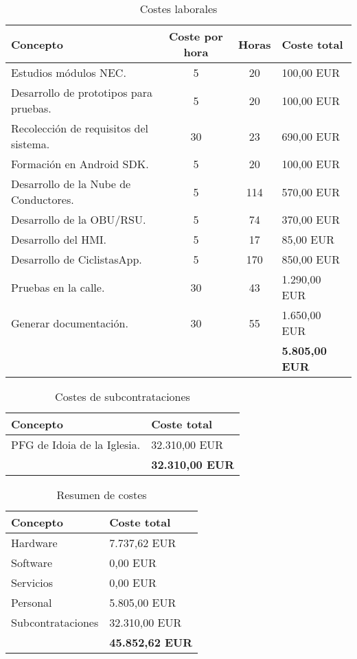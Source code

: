\begin{table}
	\centering
	\caption{Costes laborales}\label{tab:presupuestoLaboral}
	\begin{tabular}{lccl}
		\toprule
		\textbf{Concepto} & \textbf{Coste por hora} & \textbf{Horas} & \textbf{Coste total} \\
		\midrule
		Estudios módulos NEC. & 5 & 20 & 100,00 EUR \\
		Desarrollo de prototipos para pruebas. & 5 & 20 & 100,00 EUR \\
		Recolección de requisitos del sistema. & 30 & 23 & 690,00 EUR \\
		Formación en Android SDK. & 5 & 20 & 100,00 EUR \\
		Desarrollo de la Nube de Conductores. & 5 & 114 & 570,00 EUR \\
		Desarrollo de la OBU/RSU. & 5 & 74 & 370,00 EUR \\
		Desarrollo del HMI. & 5 & 17 & 85,00 EUR \\
		Desarrollo de CiclistasApp. & 5 & 170 & 850,00 EUR \\
		Pruebas en la calle. & 30 & 43 & 1.290,00 EUR \\
		Generar documentación. & 30 & 55 & 1.650,00 EUR \\
		& & & \textbf{5.805,00 EUR} \\
		\bottomrule
	\end{tabular}
\end{table}
\begin{table}
	\centering
	\caption{Costes de subcontrataciones}\label{tab:presupuestoSubcontrataciones}
	\begin{tabular}{ll}
		\toprule
		\textbf{Concepto} & \textbf{Coste total} \\
		\midrule
		PFG de Idoia de la Iglesia. & 32.310,00 EUR \\
		& \textbf{32.310,00 EUR} \\
		\bottomrule
	\end{tabular}
\end{table}
\begin{table}[tp]
	\centering
	\caption{Resumen de costes}\label{tab:presupuestoResumen}
	\begin{tabular}{ll}
		\toprule
		\textbf{Concepto} & \textbf{Coste total} \\
		\midrule
		Hardware & 7.737,62 EUR \\
		Software & 0,00 EUR \\
		Servicios & 0,00 EUR \\
		Personal & 5.805,00 EUR \\
		Subcontrataciones & 32.310,00 EUR \\
		& \textbf{45.852,62 EUR} \\
		\bottomrule
	\end{tabular}
\end{table}
